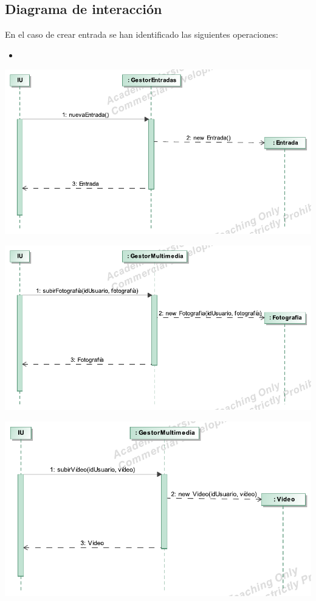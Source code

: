 \documentclass[12pt, a4paper, titlepage]{article}
\begin{document}
\subsection{Diagrama de interacción}

En el caso de {\sc crear entrada} se han identificado las siguientes operaciones:

\begin{itemize}
	\item 
\end{itemize}
\begin{center}
	\includegraphics{Imagenes/OperacionNuevaEntrada.pdf}
\end{center}

\begin{center}
	\includegraphics{Imagenes/OperacionSubirFotografia}
\end{center}

\begin{center}
	\includegraphics{Imagenes/OperacionSubirVideo}
\end{center}
\end{document}
